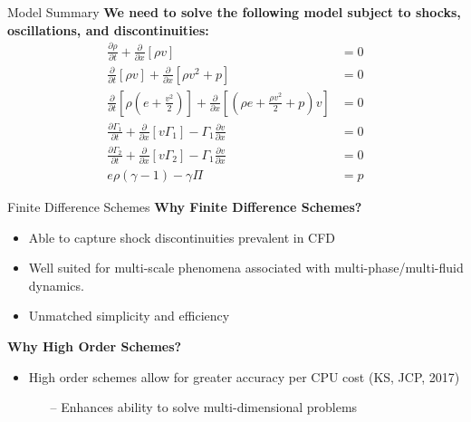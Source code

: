\documentclass[10pt]{beamer}
\begin{document}
\begin{frame}{Model Summary}
  \centering
\textbf{We need to solve the following model subject to shocks, oscillations, and discontinuities:}
\centering
  \begin{align}
    \frac{\partial \rho}{\partial t}+\frac{\partial}{\partial x}[\rho v] &=0 \nonumber\\
    \frac{\partial}{\partial t}[\rho v]+\frac{\partial}{\partial x}[\rho v^2+p]&=0 \nonumber \\
    \frac{\partial}{\partial t}[\rho(e+\tfrac{v^2}{2})]+\frac{\partial}{\partial x}[(\rho e+\tfrac{\rho v^2}{2} +p)v]&=0 \nonumber\\
    \frac{\partial \Gamma_1 }{\partial t} + \frac{\partial}{\partial x}[v\Gamma_1] - \Gamma_1 \frac{\partial v}{\partial x}&=0 \nonumber\\
    \frac{\partial \Gamma_2 }{\partial t} + \frac{\partial}{\partial x}[v\Gamma_2] - \Gamma_1 \frac{\partial v}{\partial x}&=0 \nonumber \\
    e\rho(\gamma - 1) -\gamma \Pi &=p \nonumber
    \end{align} 
\end{frame}







\begin{frame}{Finite Difference Schemes}
\textbf{Why Finite Difference Schemes?}
\begin{itemize}
\item Able to capture shock discontinuities prevalent in CFD
\item Well suited for multi-scale phenomena associated with multi-phase/multi-fluid dynamics.
\item Unmatched simplicity and efficiency
\end{itemize}
\textbf{Why High Order Schemes?}
\begin{itemize}
\item High order schemes allow for greater accuracy per CPU cost (KS, JCP, 2017) \cite{Shahbazi2017,Shahbazi}
\begin{itemize}
\item[--] Enhances ability to solve multi-dimensional problems
\end{itemize}
\end{itemize}
\end{frame}

\end{document}
